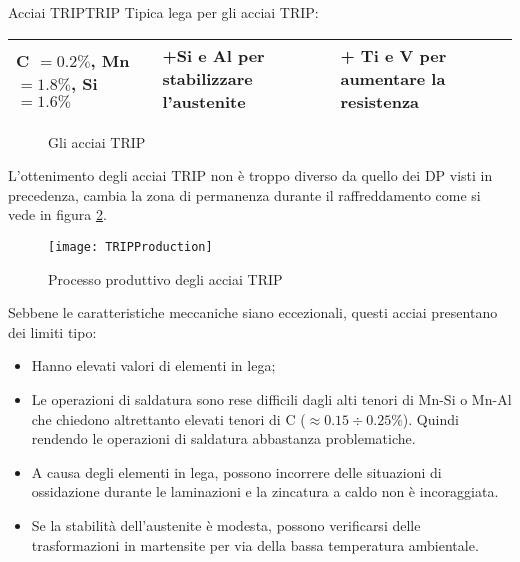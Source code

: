 \begin{definition}{Acciai TRIP}{TRIP}
Tipica lega per gli acciai \ac{TRIP}:
\begin{tabularx}{\textwidth}{XXX}
\toprule
C $= 0.2\%$, Mn $= 1.8\%$, Si $= 1.6\%$ &
+Si e Al per stabilizzare l'austenite &
+ Ti e V per aumentare la resistenza\\
\bottomrule
\end{tabularx}
\end{definition}

\begin{figure}
\centering
{}\quad
{}\quad
{}\quad
\caption{Gli acciai \ac{TRIP}}
\label{fig:AccTRIP}
\end{figure}

L'ottenimento degli acciai \ac{TRIP} non è troppo diverso da quello dei \ac{DP} visti in 
precedenza, cambia la zona di permanenza durante il raffreddamento come si vede in figura
\ref{fig:TRIPProduction}.

\begin{figure}
\centering
\texttt{[image: TRIPProduction]}
\caption{Processo produttivo degli acciai \ac{TRIP}}
\label{fig:TRIPProduction}
\end{figure}

Sebbene le caratteristiche meccaniche siano eccezionali, questi acciai presentano dei limiti tipo:
\begin{itemize}
\item Hanno elevati valori di elementi in lega;
\item Le operazioni di saldatura sono rese difficili dagli alti tenori di Mn-Si o Mn-Al che 
chiedono altrettanto elevati tenori di C ($\approx 0.15\div 0.25\%$). Quindi rendendo le operazioni 
di saldatura abbastanza problematiche.
\item A causa degli elementi in lega, possono incorrere delle situazioni di ossidazione durante
le laminazioni e la zincatura a caldo non è incoraggiata.
\item Se la stabilità dell'austenite è modesta, possono verificarsi delle trasformazioni in 
martensite per via della bassa temperatura ambientale. 
\end{itemize}

